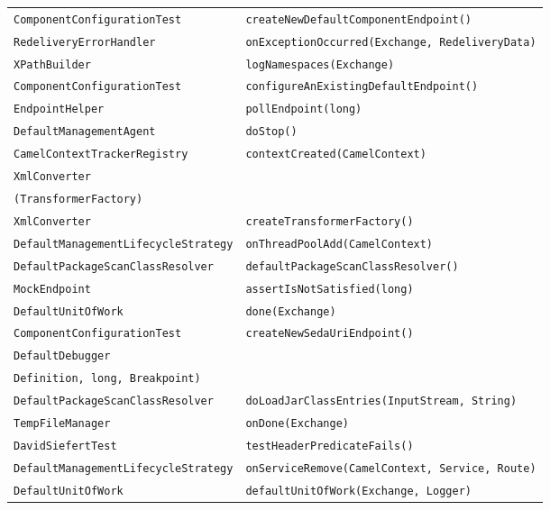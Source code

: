 \begin{center}
\begin{longtable}{ll}
\lstinline/ComponentConfigurationTest/&{\lstinline/createNewDefaultComponentEndpoint()/}\\
\lstinline/RedeliveryErrorHandler/&{\lstinline/onExceptionOccurred(Exchange, RedeliveryData)/}\\
\lstinline/XPathBuilder/&{\lstinline/logNamespaces(Exchange)/}\\
\lstinline/ComponentConfigurationTest/&{\lstinline/configureAnExistingDefaultEndpoint()/}\\
\lstinline/EndpointHelper/&{\lstinline/pollEndpoint(long)/}\\
\lstinline/DefaultManagementAgent/&{\lstinline/doStop()/}\\
\lstinline/CamelContextTrackerRegistry/&{\lstinline/contextCreated(CamelContext)/}\\
\lstinline/XmlConverter/&\raisebox{-13pt}{\shortstack{\lstinline/configureSaxonTransformerFactory/\\\lstinline/(TransformerFactory)/}}\\
\lstinline/XmlConverter/&{\lstinline/createTransformerFactory()/}\\
\lstinline/DefaultManagementLifecycleStrategy/&{\lstinline/onThreadPoolAdd(CamelContext)/}\\
\lstinline/DefaultPackageScanClassResolver/&{\lstinline/defaultPackageScanClassResolver()/}\\
\lstinline/MockEndpoint/&{\lstinline/assertIsNotSatisfied(long)/}\\
\lstinline/DefaultUnitOfWork/&{\lstinline/done(Exchange)/}\\
\lstinline/ComponentConfigurationTest/&{\lstinline/createNewSedaUriEndpoint()/}\\
\lstinline/DefaultDebugger/&\raisebox{-13pt}{\shortstack{\lstinline/onAfterProcess(Exchange, Processor, Processor/-\\\lstinline/Definition, long, Breakpoint)/}}\\
\lstinline/DefaultPackageScanClassResolver/&{\lstinline/doLoadJarClassEntries(InputStream, String)/}\\
\lstinline/TempFileManager/&{\lstinline/onDone(Exchange)/}\\
\lstinline/DavidSiefertTest/&{\lstinline/testHeaderPredicateFails()/}\\
\lstinline/DefaultManagementLifecycleStrategy/&{\lstinline/onServiceRemove(CamelContext, Service, Route)/}\\
\lstinline/DefaultUnitOfWork/&{\lstinline/defaultUnitOfWork(Exchange, Logger)/}\\

\end{longtable}
\end{center}
